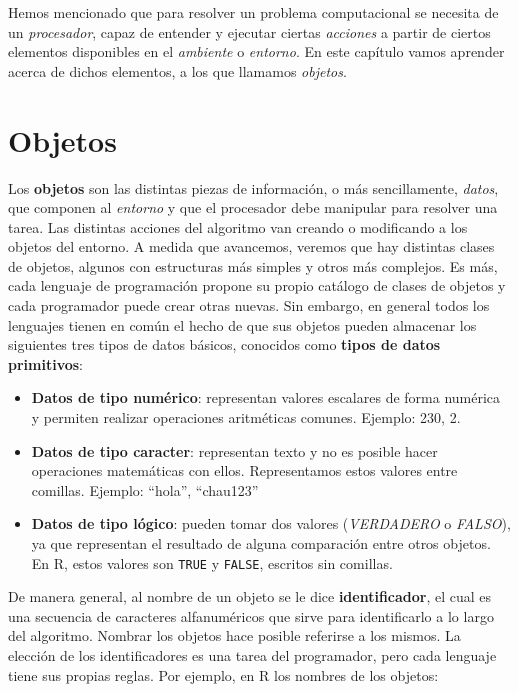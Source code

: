 \documentclass[
]{book}
\providecommand{\tightlist}{%
  \setlength{\itemsep}{0pt}\setlength{\parskip}{0pt}}
\begin{document}
Hemos mencionado que para resolver un problema computacional se necesita de un \emph{procesador}, capaz de entender y ejecutar ciertas \emph{acciones} a partir de ciertos elementos disponibles en el \emph{ambiente} o \emph{entorno}. En este capítulo vamos aprender acerca de dichos elementos, a los que llamamos \emph{objetos}.

\hypertarget{objetos}{%
\section{Objetos}\label{objetos}}

Los \textbf{objetos} son las distintas piezas de información, o más sencillamente, \emph{datos}, que componen al \emph{entorno} y que el procesador debe manipular para resolver una tarea. Las distintas acciones del algoritmo van creando o modificando a los objetos del entorno. A medida que avancemos, veremos que hay distintas clases de objetos, algunos con estructuras más simples y otros más complejos. Es más, cada lenguaje de programación propone su propio catálogo de clases de objetos y cada programador puede crear otras nuevas. Sin embargo, en general todos los lenguajes tienen en común el hecho de que sus objetos pueden almacenar los siguientes tres tipos de datos básicos, conocidos como \textbf{tipos de datos primitivos}:

\begin{itemize}
\tightlist
\item
  \textbf{Datos de tipo numérico}: representan valores escalares de forma numérica y permiten realizar operaciones aritméticas comunes. Ejemplo: 230, 2.
\item
  \textbf{Datos de tipo caracter}: representan texto y no es posible hacer operaciones matemáticas con ellos. Representamos estos valores entre comillas. Ejemplo: ``hola'', ``chau123''
\item
  \textbf{Datos de tipo lógico}: pueden tomar dos valores (\emph{VERDADERO} o \emph{FALSO}), ya que representan el resultado de alguna comparación entre otros objetos. En R, estos valores son \texttt{TRUE} y \texttt{FALSE}, escritos sin comillas.
\end{itemize}

De manera general, al nombre de un objeto se le dice \textbf{identificador}, el cual es una secuencia de caracteres alfanuméricos que sirve para identificarlo a lo largo del algoritmo. Nombrar los objetos hace posible referirse a los mismos. La elección de los identificadores es una tarea del programador, pero cada lenguaje tiene sus propias reglas. Por ejemplo, en R los nombres de los objetos:
\end{document}

